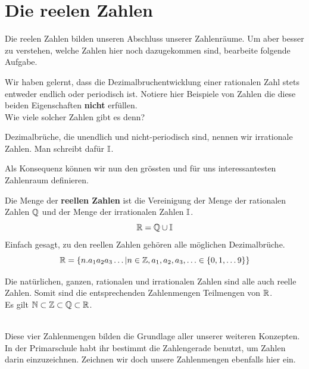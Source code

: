 \documentclass[11pt,oneside]{article}
\begin{document}
\section{Die reelen Zahlen}
    Die reelen Zahlen bilden unseren Abschluss unserer Zahlenräume. Um aber besser zu verstehen, welche Zahlen hier noch dazugekommen sind, bearbeite folgende Aufgabe.
    \begin{aufgabe}
        Wir haben gelernt, dass die Dezimalbruchentwicklung einer rationalen Zahl stets entweder endlich oder periodisch ist. Notiere hier Beispiele von Zahlen die diese beiden Eigenschaften \textbf{nicht} erfüllen.\vspace{5pt}\\
        Wie viele solcher Zahlen gibt es denn?\vspace{5pt}\\
    \end{aufgabe}
    \begin{definition}
        Dezimalbrüche, die unendlich und nicht-periodisch sind, nennen wir irrationale Zahlen. Man schreibt dafür $\mathbb{I}$.
    \end{definition}
    Als Konsequenz können wir nun den grössten und für uns interessantesten Zahlenraum definieren.
    \begin{definition}
        Die Menge der \textbf{reellen Zahlen} ist die Vereinigung der Menge der rationalen Zahlen $\mathbb{Q}$ und der Menge der irrationalen Zahlen $\mathbb{I}$. \[\mathbb{R}=\mathbb{Q}\cup\mathbb{I}\]
        Einfach gesagt, zu den reellen Zahlen gehören alle möglichen Dezimalbrüche. \[\mathbb{R}=\left\{n.a_1a_2a_3\ldots\vert n\in\mathbb{Z},a_1,a_2,a_3,\ldots\in\{0,1,\ldots9\}\right\}\]
    \end{definition}\vspace{5pt}
    \begin{minipage}{0.47\linewidth}
        Die natürlichen, ganzen, rationalen und irrationalen Zahlen sind alle auch reelle Zahlen. Somit sind die entsprechenden Zahlenmengen Teilmengen von $\mathbb{R}$.\\
        Es gilt $\mathbb{N}\subset\mathbb{Z}\subset\mathbb{Q}\subset\mathbb{R}$.\\
    \end{minipage}
    \hfill
    \begin{minipage}{0.47\linewidth}
    \end{minipage}\vspace{24pt}\\
    Diese vier Zahlenmengen bilden die Grundlage aller unserer weiteren Konzepten. In der Primarschule habt ihr bestimmt die Zahlengerade benutzt, um Zahlen darin einzuzeichnen. Zeichnen wir doch unsere Zahlenmengen ebenfalls hier ein.
\end{document}
